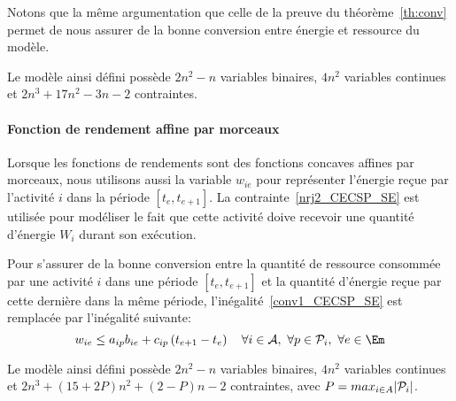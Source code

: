 Notons que la même argumentation que celle de la preuve du
théorème~\ref{th:conv} permet de nous assurer de la bonne conversion
entre énergie et ressource du modèle. 

Le modèle ainsi défini possède $2n^2-n$ variables binaires, $4n^2$
variables continues et $2n^3+17n^2-3n-2$ contraintes.

\paragraph{Fonction de rendement affine par morceaux}

Lorsque les fonctions de rendements sont des fonctions concaves
affines par morceaux, nous utilisons aussi la variable $w_{ie}$ pour
représenter l'énergie reçue par l'activité $i$ dans la période
$[t_e,t_{e+1}]$. La contrainte~\eqref{nrj2_CECSP_SE} est utilisée pour
modéliser le fait que cette activité doive recevoir une quantité
d'énergie $W_i$ durant son exécution.

Pour s'assurer de la bonne conversion entre la quantité de ressource
consommée par une activité $i$ dans une période $[t_e,t_{e+1}]$ et la
quantité d'énergie reçue par cette dernière dans la même période,
l'inégalité~\eqref{conv1_CECSP_SE} est remplacée par l'inégalité
suivante:
\begin{equation}
w_{ie} \le a_{ip}b_{ie} + c_{ip}\left( t_{e+1} - t_e\right) \quad  
\forall i \in \A,\ \forall p \in \P_i,\ \forall e \in \Em
\label{conv2_CECSP_SE}
\end{equation}

Le modèle ainsi défini possède $2n^2-n$ variables binaires, $4n^2$
variables continues et $2n^3+(15 + 2P)n^2+\left(2-P\right)n-2$
contraintes, avec $P=max_{i\in A}|\P_i|$.    
